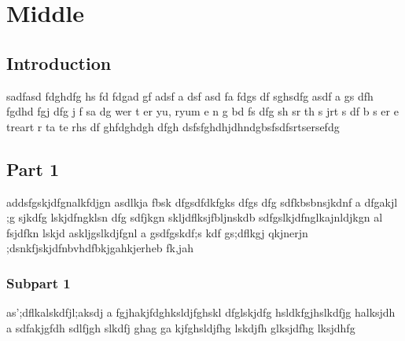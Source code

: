 \documentclass[a4paper, 12pt]{report}
\begin{document}
	\chapter{Middle}
	\section{Introduction}
	sadfasd fdghdfg hs fd  fdgad gf adsf a dsf asd fa fdgs df sghsdfg
	asdf a gs dfh  fgdhd fgj  dfg j f sa dg wer t er yu, ryum e n g bd
	fs dfg sh sr th s jrt s  df b s er e treart r ta te rhs df ghfdghdgh dfgh
	dsfsfghdhjdhndgbsfsdfsrtsersefdg
	
	\section{Part 1}
	addsfgskjdfgnalkfdjgn asdlkja fbsk dfgsdfdkfgks dfgs dfg sdfkbsbnsjkdnf a dfgakjl ;g
	sjkdfg lskjdfngklsn dfg sdfjkgn skljdflksjfbljnskdb sdfgslkjdfnglkajnldjkgn al fsjdfkn lskjd 
	askljgslkdjfgnl  a gsdfgskdf;s kdf gs;dflkgj qkjnerjn ;dsnkfjskjdfnbvhdfbkjgahkjerheb fk,jah
	
	\subsection{Subpart 1}
	as';dflkalskdfjl;aksdj a fgjhakjfdghksldjfghskl dfglskjdfg hsldkfgjhslkdfjg halksjdh a
	sdfakjgfdh sdlfjgh slkdfj ghag
	ga kjfghsldjfhg lskdjfh glksjdfhg lksjdhfg
	
	
	
\end{document}
